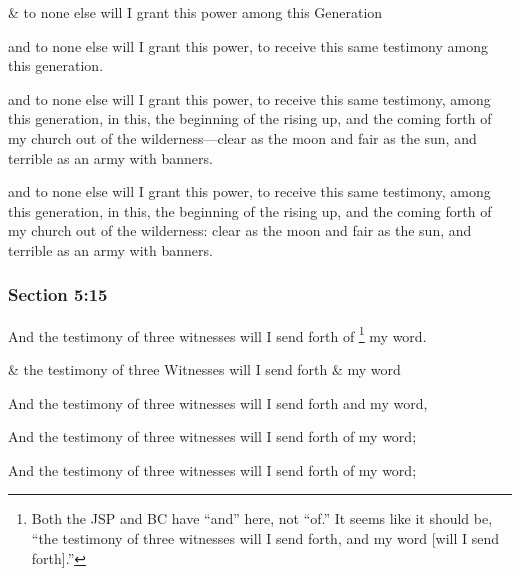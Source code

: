 		\begin{framed}
		\scriptsize
			\begin{compactdesc}
				\item[JSP] \& to none else will I grant this power among this Generation
				\item[RB1] [\textit{missing}]
				\item[BC] and to none else will I grant this power, to receive this same testimony among this generation. 
				\item[DC 1835] and to none else will I grant this power, to receive this same testimony, among this generation, in this, the beginning of the rising up, and the coming forth of my church out of the wilderness---clear as the moon and fair as the sun, and terrible as an army with banners.
				\item[DC 1844] and to none else will I grant this power, to receive this same testimony, among this generation, in this, the beginning of the rising up, and the coming forth of my church out of the wilderness: clear as the moon and fair as the sun, and terrible as an army with banners.
			\end{compactdesc}
		\end{framed}

	\subsubsection{Section 5:15} %
		\label{DC5-15}

		And the testimony of three witnesses will I send forth of%
			\footnote{%
				Both the JSP and BC have ``and'' here, not ``of.'' It seems like it should be, ``the testimony of three witnesses will I send forth, and my word [will I send forth].''
				}
		my word.

		\begin{framed}
		\scriptsize
			\begin{compactdesc}
				\item[JSP] \& the testimony of three Witnesses will I send forth \& my word
				\item[RB1] [\textit{missing}]
				\item[BC] And the testimony of three witnesses will I send forth and my word, 
				\item[DC 1835] And the testimony of three witnesses will I send forth of my word;
				\item[DC 1844] And the testimony of three witnesses will I send forth of my word;
			\end{compactdesc}
		\end{framed}


